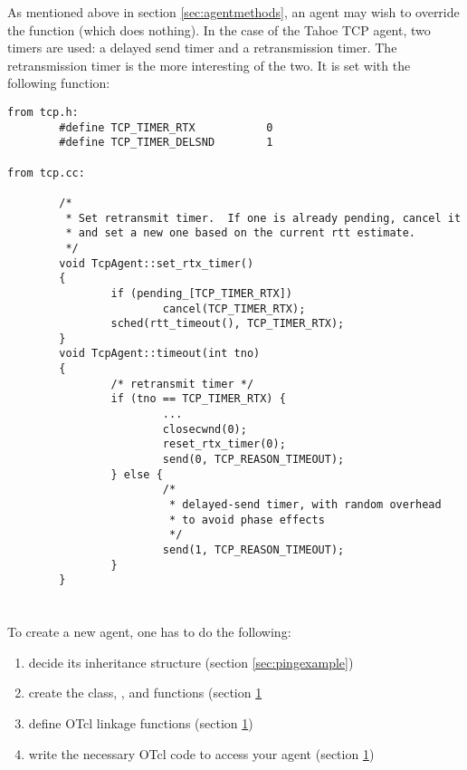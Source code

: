 As mentioned above in section \ref{sec:agentmethods}, an agent
may wish to override the  function (which does
nothing).
In the case of the Tahoe TCP agent, two timers are used: a delayed
send timer and a retransmission timer.
The retransmission timer is the more interesting of the two.
It is set with the following function:
\begin{small}
\begin{verbatim}
from tcp.h:
        #define TCP_TIMER_RTX           0
        #define TCP_TIMER_DELSND        1

from tcp.cc:

        /*
         * Set retransmit timer.  If one is already pending, cancel it
         * and set a new one based on the current rtt estimate.
         */
        void TcpAgent::set_rtx_timer()
        {
                if (pending_[TCP_TIMER_RTX])
                        cancel(TCP_TIMER_RTX);
                sched(rtt_timeout(), TCP_TIMER_RTX);
        }
        void TcpAgent::timeout(int tno)
        {
                /* retransmit timer */
                if (tno == TCP_TIMER_RTX) {
                        ...
                        closecwnd(0);
                        reset_rtx_timer(0);
                        send(0, TCP_REASON_TIMEOUT);
                } else {
                        /*
                         * delayed-send timer, with random overhead
                         * to avoid phase effects
                         */
                        send(1, TCP_REASON_TIMEOUT);
                }
        }

\end{verbatim}
\end{small}

\section{}

To create a new agent, one has to do the following:
\begin{enumerate}
        \item decide its inheritance structure (section \ref{sec:pingexample})
        \item create the class, , and  functions (section \ref{}
        \item define OTcl linkage functions (section \ref{})
        \item write the necessary OTcl code to access your agent (section \ref{})
\end{enumerate}

